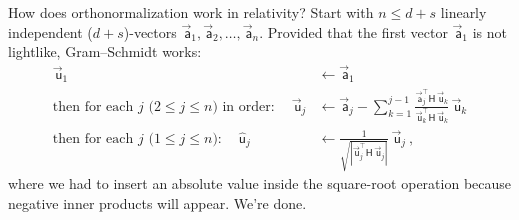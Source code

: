 \documentclass{article}
\newcommand{\metric}{\mathsf{H}}
\newcommand\upvec[1]{\!\vec{\,\mathrm{#1}}}
\newcommand{\Lvec}[1]{\upvec{\mathsf{#1}}} %
\newcommand{\Lhat}[1]{\hat{\mathsf{#1}}} %
\newcommand{\plus}{\!+\!} %
\begin{document}
How does orthonormalization work in relativity?
Start with $n\leq d+s$ linearly independent ($d\plus s$)-vectors $\Lvec{a}_1,\Lvec{a}_2,\ldots,\Lvec{a}_n$.
Provided that the first vector $\Lvec{a}_1$ is not lightlike, Gram--Schmidt works:
\begin{align}
    \Lvec{u}_1 &\leftarrow \Lvec{a}_1 \label{eq:rgs1}
    \\
    \mbox{then for each $j$ ($2\leq j\leq n$) in order:} \quad~ \Lvec{u}_j &\leftarrow \Lvec{a}_j - \sum_{k=1}^{j-1} \frac{\Lvec{a}_j^\top\metric\,\Lvec{u}_k}{\Lvec{u}_k^\top\metric\,\Lvec{u}_k}\,\Lvec{u}_k \label{eq:rgs2}
    \\
    \mbox{then for each $j$ ($1\leq j\leq n$):} \quad~ \Lhat{u}_j &\leftarrow \frac{1}{\sqrt{|\Lvec{u}_j^\top\metric\,\Lvec{u}_j|}}\,\Lvec{u}_j ~, \label{eq:rgs3}
\end{align}
where we had to insert an absolute value inside the square-root operation because negative inner products will appear.
We're done.
\end{document}
